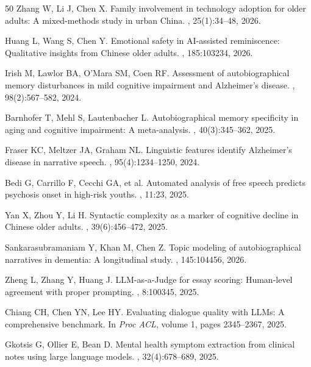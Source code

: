 \documentclass{article}
\begin{document}
\begin{thebibliography}{50}
Zhang W, Li J, Chen X.
\newblock Family involvement in technology adoption for older adults: A mixed-methods study in urban China.
, 25(1):34--48, 2026.

Huang L, Wang S, Chen Y.
\newblock Emotional safety in AI-assisted reminiscence: Qualitative insights from Chinese older adults.
, 185:103234, 2026.

Irish M, Lawlor BA, O'Mara SM, Coen RF.
\newblock Assessment of autobiographical memory disturbances in mild cognitive impairment and Alzheimer's disease.
, 98(2):567--582, 2024.

Barnhofer T, Mehl S, Lautenbacher L.
\newblock Autobiographical memory specificity in aging and cognitive impairment: A meta-analysis.
, 40(3):345--362, 2025.

Fraser KC, Meltzer JA, Graham NL.
\newblock Linguistic features identify Alzheimer's disease in narrative speech.
, 95(4):1234--1250, 2024.

Bedi G, Carrillo F, Cecchi GA, et al.
\newblock Automated analysis of free speech predicts psychosis onset in high-risk youths.
, 11:23, 2025.

Yan X, Zhou Y, Li H.
\newblock Syntactic complexity as a marker of cognitive decline in Chinese older adults.
, 39(6):456--472, 2025.

Sankarasubramaniam Y, Khan M, Chen Z.
\newblock Topic modeling of autobiographical narratives in dementia: A longitudinal study.
, 145:104456, 2026.

Zheng L, Zhang Y, Huang J.
\newblock LLM-as-a-Judge for essay scoring: Human-level agreement with proper prompting.
, 8:100345, 2025.

Chiang CH, Chen YN, Lee HY.
\newblock Evaluating dialogue quality with LLMs: A comprehensive benchmark.
\newblock In {\em Proc ACL}, volume 1, pages 2345--2367, 2025.

Gkotsis G, Ollier E, Bean D.
\newblock Mental health symptom extraction from clinical notes using large language models.
, 32(4):678--689, 2025.


\end{thebibliography}
\end{document}
